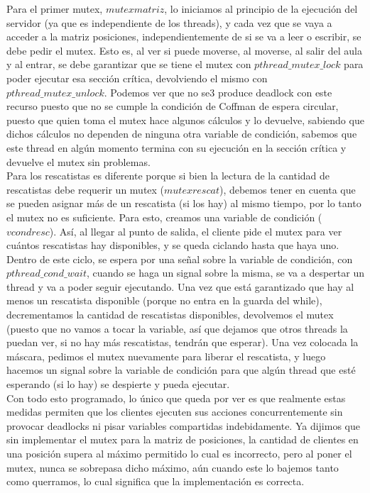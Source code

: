 \documentclass[a4paper, 11pt]{article}
\begin{document}
Para el primer mutex, $mutexmatriz$, lo iniciamos al principio de la ejecución del servidor (ya que es independiente de los threads), y cada vez que se vaya a acceder a la matriz posiciones, independientemente de si se va a leer o escribir, se debe pedir el mutex. Esto es, al ver si puede moverse, al moverse, al salir del aula y al entrar, se debe garantizar que se tiene el mutex con $pthread\_mutex\_lock$ para poder ejecutar esa sección crítica, devolviendo el mismo con $pthread\_mutex\_unlock$. Podemos ver que no se3 produce deadlock con este recurso puesto que no se cumple la condición de Coffman de espera circular, puesto que quien toma el mutex hace algunos cálculos y lo devuelve, sabiendo que dichos cálculos no dependen de ninguna otra variable de condición, sabemos que este thread en algún momento termina con su ejecución en la sección crítica y devuelve el mutex sin problemas. \\

Para los rescatistas es diferente porque si bien la lectura de la cantidad de rescatistas debe requerir un mutex ($mutexrescat$), debemos tener en cuenta que se pueden asignar más de un rescatista (si los hay) al mismo tiempo, por lo tanto el mutex no es suficiente. Para esto, creamos una variable de condición ($vcondresc$). Así, al llegar al punto de salida, el cliente pide el mutex para ver cuántos rescatistas hay disponibles, y se queda ciclando hasta que haya uno. Dentro de este ciclo, se espera por una señal sobre la variable de condición, con $pthread\_cond\_wait$, cuando se haga un signal sobre la misma, se va a despertar un thread y va a poder seguir ejecutando. Una vez que está garantizado que hay al menos un rescatista disponible (porque no entra en la guarda del while), decrementamos la cantidad de rescatistas disponibles, devolvemos el mutex (puesto que no vamos a tocar la variable, así que dejamos que otros threads la puedan ver, si no hay más rescatistas, tendrán que esperar). Una vez colocada la máscara, pedimos el mutex nuevamente para liberar el rescatista, y luego hacemos un signal sobre la variable de condición para que algún thread que esté esperando (si lo hay) se despierte y pueda ejecutar.\\

Con todo esto programado, lo único que queda por ver es que realmente estas medidas permiten que los clientes ejecuten sus acciones concurrentemente sin provocar deadlocks ni pisar variables compartidas indebidamente. Ya dijimos que sin implementar el mutex para la matriz de posiciones, la cantidad de clientes en una posición supera al máximo permitido lo cual es incorrecto, pero al poner el mutex, nunca se sobrepasa dicho máximo, aún cuando este lo bajemos tanto como querramos, lo cual significa que la implementación es correcta.
\end{document}
